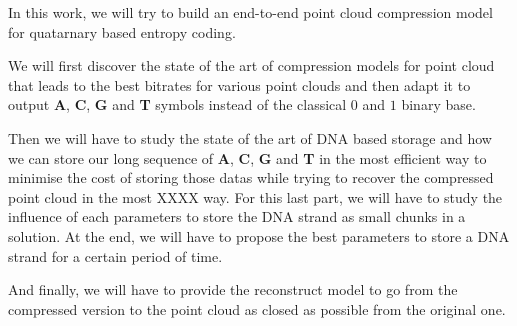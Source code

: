 
\newcommand{\ACGT}{\textbf{A}, \textbf{C}, \textbf{G} and \textbf{T}}

In this work, we will try to build an end-to-end point cloud compression model for quatarnary based entropy coding. 

We will first discover the state of the art of compression models for point cloud that leads to the best bitrates for various point clouds and then adapt it to output \ACGT{} symbols instead of the classical $0$ and $1$ binary base.

Then we will have to study the state of the art of DNA based storage and how we can store our long sequence of \ACGT{} in the most efficient way to minimise the cost of storing those datas while trying to recover the compressed point cloud in the most XXXX way.
For this last part, we will have to study the influence of each parameters to store the DNA strand as small chunks in a solution. At the end, we will have to propose the best parameters to store a DNA strand for a certain period of time.

And finally, we will have to provide the reconstruct model to go from the compressed version to the point cloud as closed as possible from the original one.

\tocontinue{}
